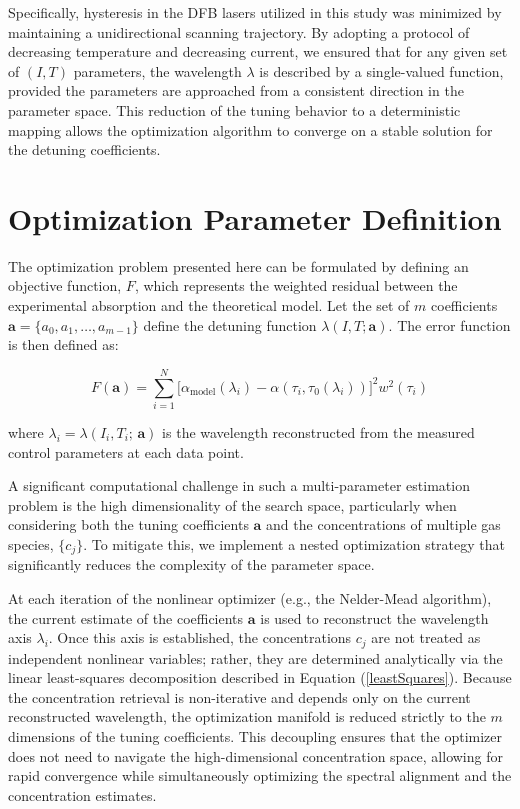\documentclass[12pt]{report}
\begin{document}
	Specifically, hysteresis in the DFB lasers utilized in this study was minimized by maintaining a unidirectional scanning trajectory. By adopting a protocol of decreasing temperature and decreasing current, we ensured that for any given set of $(I, T)$ parameters, the wavelength $\lambda$ is described by a single-valued function, provided the parameters are approached from a consistent direction in the parameter space. This reduction of the tuning behavior to a deterministic mapping allows the optimization algorithm to converge on a stable solution for the detuning coefficients.
	
	\section{Optimization Parameter Definition}
	The optimization problem presented here can be formulated by defining an objective function, $F$, which represents the weighted residual between the experimental absorption and the theoretical model. Let the set of $m$ coefficients $\mathbf{a} = \{a_0, a_1, \dots, a_{m-1}\}$ define the detuning function $\lambda(I, T; \mathbf{a})$. The error function is then defined as:
	
	\begin{equation}
		F(\mathbf{a}) = \sum_{i=1}^{N} \Big[ \alpha_\mathrm{model}(\lambda_i) - \alpha(\tau_i, \tau_0(\lambda_i)) \Big]^2 w^2(\tau_i)
	\end{equation}
	
	where $\lambda_i = \lambda(I_i, T_i;\,\mathbf{a})$ is the wavelength reconstructed from the measured control parameters at each data point. 
	
	A significant computational challenge in such a multi-parameter estimation problem is the high dimensionality of the search space, particularly when considering both the tuning coefficients $\mathbf{a}$ and the concentrations of multiple gas species, $\{c_j\}$. To mitigate this, we implement a nested optimization strategy that significantly reduces the complexity of the parameter space. 
	
	At each iteration of the nonlinear optimizer (e.g., the Nelder-Mead algorithm), the current estimate of the coefficients $\mathbf{a}$ is used to reconstruct the wavelength axis $\lambda_i$. Once this axis is established, the concentrations $c_j$ are not treated as independent nonlinear variables; rather, they are determined analytically via the linear least-squares decomposition described in Equation (\ref{leastSquares}). Because the concentration retrieval is non-iterative and depends only on the current reconstructed wavelength, the optimization manifold is reduced strictly to the $m$ dimensions of the tuning coefficients. This decoupling ensures that the optimizer does not need to navigate the high-dimensional concentration space, allowing for rapid convergence while simultaneously optimizing the spectral alignment and the concentration estimates.
	
\end{document}
